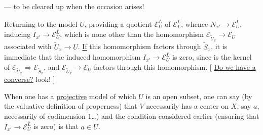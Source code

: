 --- to be cleared up when the occasion arises!

Returning to the model $U$, providing
a quotient $\mathcal E_U^{\overline L}$ of $\mathcal E_L^{\overline L}$, whence
$N_{x'}\longrightarrow\mathcal E_U^{\overline L}$, inducing $I_{x'}\longrightarrow\mathcal E_U^{\overline L}$,
which is none other than the homomorphism \unsure{---} $\mathcal E_{\widetilde U_x}\longrightarrow\mathcal E_U$
associated with $\widetilde U_x\longrightarrow U$. \uline{If} this homomorphism
factors through $\widetilde S_x$, it is immediate
that the induced homomorphism $I_{x'}\longrightarrow\mathcal E_U^{\overline L}$ is
zero, since   is the kernel of
$\mathcal E_{\widetilde U_x}\Longrightarrow\mathcal E_{\widetilde S_x}$, and $\mathcal E_{\widetilde U_x}\longrightarrow\mathcal E_U$ factors through
this homomorphism.
[ \uline{Do we have a converse?} look! ]

When one has a
\uline{projective} model of which $U$ is an open subset,
one can say (by the valuative definition of
properness) that $V$ necessarily has
a center on $X$, say $a$,  
necessarily of codimension 1\ldots) and the condition
considered earlier (ensuring that $I_{x'}\longrightarrow
\mathcal E_U^{\overline L}$ is zero) is that $a\in U$.
